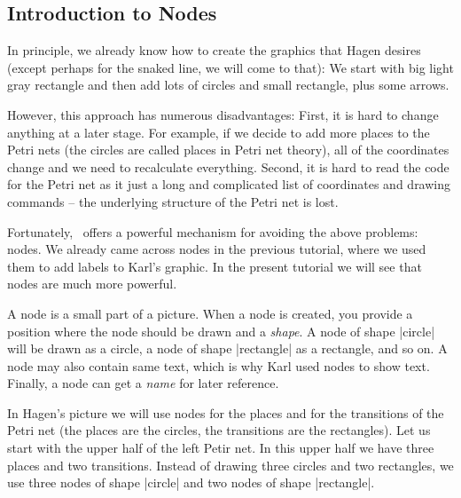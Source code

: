 \subsection{Introduction to Nodes}

In principle, we already know how to create the graphics that Hagen
desires (except perhaps for the snaked line, we will come to that): We
start with big light gray rectangle and then add lots of circles and
small rectangle, plus some arrows.

However, this approach has numerous disadvantages: First, it is hard
to change anything at a later stage. For example, if we decide to add
more places to the Petri nets (the circles are called places in Petri
net theory), all of the coordinates change and we need to recalculate
everything. Second, it is hard to read the code for the Petri net as
it just a long and complicated list of coordinates and drawing
commands -- the underlying structure of the Petri net is lost.

Fortunately, \tikzname\ offers a powerful mechanism for avoiding the
above problems: nodes. We already came across nodes in the previous
tutorial, where we used them to add labels to Karl's graphic. In the
present tutorial we will see that nodes are much more powerful.

A node is a small part of a picture. When a node is created, you
provide a position where the node should be drawn and a
\emph{shape}. A node of shape |circle| will be drawn as a circle, a
node of shape |rectangle| as a rectangle, and so on. A node may also
contain same text, which is why Karl used nodes to show text. Finally,
a node can get a \emph{name} for later reference.

In Hagen's picture we will use nodes for the places and for the
transitions of the Petri net (the places are the circles, the
transitions are the rectangles). Let us start with the upper half of
the left Petir net. In this upper half we have three places and two
transitions. Instead of drawing three circles and two rectangles, we
use three nodes of shape |circle| and two nodes of shape
|rectangle|.

\begin{codeexample}[]
\end{codeexample}


